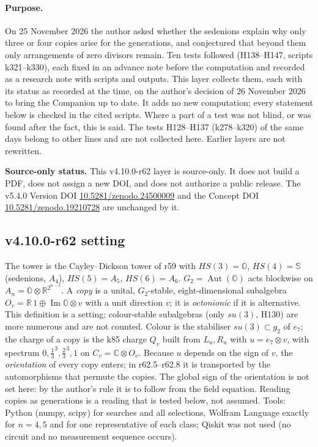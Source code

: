 \paragraph{Purpose.}
On 25 November 2026 the author asked whether the sedenions explain why only three or four copies arise for the generations, and conjectured that
beyond them only arrangements of zero divisors remain.  Ten tests followed (H138--H147, scripts k321--k330), each fixed in an advance note before
the computation and recorded as a research note with scripts and outputs.  This layer collects them, each with its status as recorded at the time,
on the author's decision of 26 November 2026 to bring the Companion up to date.  It adds no new computation; every statement below is checked in
the cited scripts.  Where a part of a test was not blind, or was found after the fact, this is said.  The tests H128--H137 (k278--k320) of the same
days belong to other lines and are not collected here.  Earlier layers are not rewritten.

\noindent\textbf{Source-only status.}
This v4.10.0-r62 layer is source-only.  It does not build a PDF, does not assign a new DOI,
and does not authorize a public release.  The v5.4.0 Version DOI
\href{https://doi.org/10.5281/zenodo.24500009}{10.5281/zenodo.24500009} and the Concept DOI
\href{https://doi.org/10.5281/zenodo.19210728}{10.5281/zenodo.19210728} are unchanged by it.

\subsection*{v4.10.0-r62 setting}
\label{subsec:v4100-r62-setting}

The tower is the Cayley--Dickson tower of r59 with \(HS(3)=\mathbb O\), \(HS(4)=\mathbb S\) (sedenions, \(A_4\)), \(HS(5)=A_5\), \(HS(6)=A_6\).
\(G_2=\operatorname{Aut}(\mathbb O)\) acts blockwise on \(A_n=\mathbb O\otimes\mathbb R^{2^{n-3}}\).  A \emph{copy} is a unital, \(G_2\)-stable,
eight-dimensional subalgebra \(O_v=\mathbb R\,1\oplus\operatorname{Im}\mathbb O\otimes v\) with a unit direction \(v\); it is \emph{octonionic} if
it is alternative.  This definition is a setting; colour-stable subalgebras (only \(su(3)\), H130) are more numerous and are not counted.
Colour is the stabiliser \(su(3)\subset g_2\) of \(e_7\); the charge of a copy is the k85 charge \(Q_v\) built from \(L_u,R_u\) with
\(u=e_7\otimes v\), with spectrum \(0,\tfrac13^3,\tfrac23^3,1\) on \(C_v=\mathbb C\otimes O_v\).  Because \(u\) depends on the sign of \(v\), the
\emph{orientation} of every copy enters; in r62.5--r62.8 it is transported by the automorphisms that permute the copies.  The global sign of the
orientation is not set here: by the author's rule it is to follow from the field equation.  Reading copies as generations is a reading that is
tested below, not assumed.  Tools: Python (numpy, scipy) for searches and all selections, Wolfram Language exactly for \(n=4,5\) and for one
representative of each class; Qiskit was not used (no circuit and no measurement sequence occurs).

